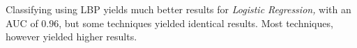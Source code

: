 \documentclass[letterpaper]{report}
\begin{document}

Classifying using LBP yields much better results for \textit{Logistic Regression,} with an AUC of $0.96$, but some techniques yielded identical results. Most techniques, however yielded higher results.
\begin{tiny}
\renewcommand{\arraystretch}{1.2}

\end{tiny}


%

%
%
%
\end{document}
